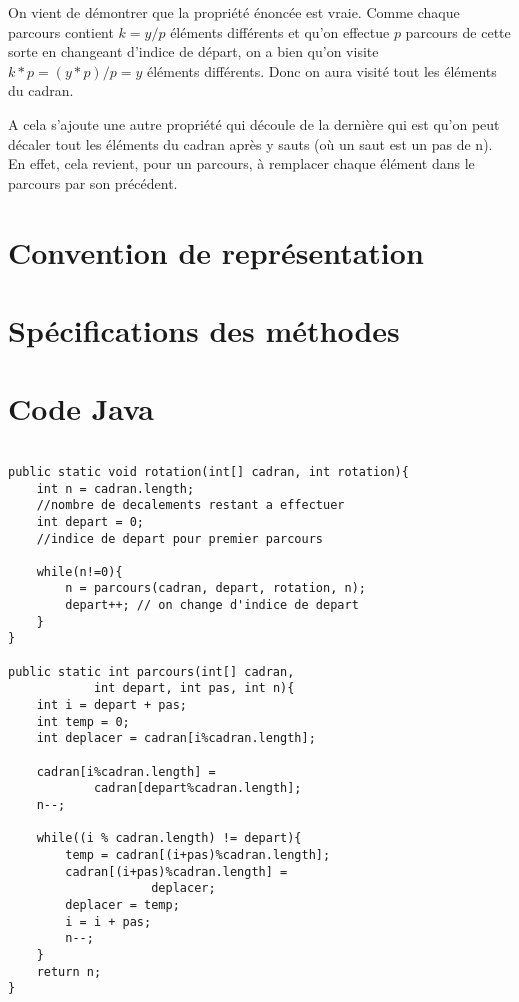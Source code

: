 \documentclass[a4paper, 12pt]{report}
\begin{document}
On vient de démontrer que la propriété énoncée est vraie. Comme chaque parcours contient $k = y/p$ éléments différents et qu'on effectue $p$ parcours de cette sorte en changeant d'indice de départ, on a bien qu'on visite $k*p = (y*p)/p = y $ éléments différents. Donc on aura visité tout les éléments du cadran. \newline

A cela s'ajoute une autre propriété qui découle de la dernière qui est qu'on peut décaler tout les éléments du cadran après y sauts (où un saut est un pas de n). En effet, cela revient, pour un parcours, à remplacer chaque élément dans le parcours par son précédent.

\section{Convention de représentation}

\section{Spécifications des méthodes}

\section{Code Java}

\lstset{language=Java}

\begin{lstlisting}[frame=single]

public static void rotation(int[] cadran, int rotation){
	int n = cadran.length;  
	//nombre de decalements restant a effectuer
	int depart = 0;		
	//indice de depart pour premier parcours
		
	while(n!=0){
		n = parcours(cadran, depart, rotation, n);
		depart++; // on change d'indice de depart
	}
}

public static int parcours(int[] cadran, 
			int depart, int pas, int n){
	int i = depart + pas;	
	int temp = 0;	
	int deplacer = cadran[i%cadran.length]; 
		
	cadran[i%cadran.length] = 
			cadran[depart%cadran.length];
	n--;
		
	while((i % cadran.length) != depart){
		temp = cadran[(i+pas)%cadran.length];
		cadran[(i+pas)%cadran.length] = 
					deplacer;
		deplacer = temp;
		i = i + pas;
		n--;
	}
	return n;
}

\end{lstlisting} 
\end{document}

